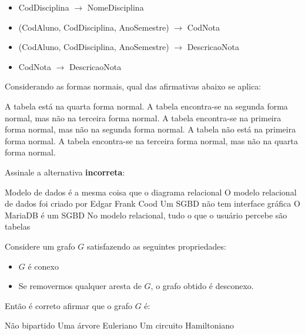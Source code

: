 \documentclass[12pt, addpoints]{exam}
\begin{document}
\begin{questions}
\begin{itemize}
    \item CodDisciplina \(\rightarrow\) NomeDisciplina

    \item (CodAluno, CodDisciplina, AnoSemestre) \(\rightarrow\) CodNota

    \item (CodAluno, CodDisciplina, AnoSemestre) \(\rightarrow\) DescricaoNota

    \item CodNota \(\rightarrow\) DescricaoNota

\end{itemize}



Considerando as formas normais, qual das afirmativas abaixo se aplica:
\begin{choices}
\choice A tabela está na quarta forma normal.
\choice A tabela encontra-se na segunda forma normal, mas não na terceira forma normal.
\choice A tabela encontra-se na primeira forma normal, mas não na segunda forma normal.
\choice A tabela não está na primeira forma normal.
\choice A tabela encontra-se na terceira forma normal, mas não na quarta forma normal.
\end{choices}

\question Assinale a alternativa \textbf{incorreta}:
\begin{choices}
\choice Modelo de dados é a mesma coisa que o diagrama relacional
\choice O modelo relacional de dados foi criado por Edgar Frank Cood
\choice Um SGBD não tem interface gráfica
\choice O MariaDB é um SGBD
\choice No modelo relacional, tudo o que o usuário percebe são tabelas
\end{choices}

\question

Considere um grafo \( G \) satisfazendo as seguintes propriedades:



\begin{itemize}

    \item \( G \) é conexo

    \item Se removermos qualquer aresta de \( G \), o grafo obtido é desconexo.

\end{itemize}



Então é correto afirmar que o grafo \( G \) é:
\begin{choices}
\choice Não bipartido
\choice Uma árvore
\choice Euleriano
\choice Um circuito
\choice Hamiltoniano
\end{choices}



    \end{questions}
    
\end{document}
